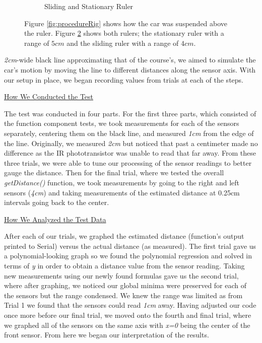 \documentclass[twocolumn]{article}
\newcommand{\rpm}{\raisebox{.2ex}{$\scriptstyle\pm$}}
\newcommand{\subsectionTitle}[1]{ {\hspace{2em}\uline{#1}} \\ \vspace{1em} }
\begin{document}
\begin{flushleft}
\begin{figure}[H]
{\begin{subfigure}[b]{0.45\textwidth}
					\caption{Sliding and Stationary Ruler}
					\label{fig:procedureRuler}
				\end{subfigure}
				
				\caption{Figure \ref{fig:procedureRig} shows how the car was suspended above the ruler. Figure \ref{fig:procedureRuler} shows both rulers; the stationary ruler with a range of \rpm$5cm$ and the sliding ruler with a range of \rpm$4cm$.}
			}
		\end{figure}

		\textit{2cm}-wide black line approximating that of the course’s, we aimed to simulate the car’s motion by moving the line to different distances along the sensor axis. With our setup in place, we began recording values from trials at each of the steps. \\ \vspace{1em}
		
		\subsectionTitle{How We Conducted the Test}

		\hspace{1em}The test was conducted in four parts. For the first three parts, which consisted of the function component tests, we took measurements for each of the sensors separately, centering them on the black line, and measured \rpm\textit{1cm} from the edge of the line. Originally, we measured \rpm\textit{2cm} but noticed that past a centimeter made no difference as the IR phototransistor was unable to read that far away. From these three trials, we were able to tune our processing of the sensor readings to better gauge the distance. Then for the final trial, where we tested the overall \textit{getDistance()} function, we took measurements by going to the right and left sensors (\rpm\textit{4cm}) and taking measurements of the estimated distance at 0.25cm intervals going back to the center. \\ \vspace{1em}
		
		\subsectionTitle{How We Analyzed the Test Data}

		\hspace{1em}After each of our trials, we graphed the estimated distance (function’s output printed to Serial) versus the actual distance (as measured). The first trial gave us a polynomial-looking graph so we found the polynomial regression and solved in terms of \textit{y} in order to obtain a distance value from the sensor reading. Taking new measurements using our newly found formulas gave us the second trial, where after graphing, we noticed our global minima were preserved for each of the sensors but the range condensed. We knew the range was limited as from Trial 1 we found that the sensors could read \rpm\textit{1cm} away. Having adjusted our code once more before our final trial, we moved onto the fourth and final trial, where we graphed all of the sensors on the same axis with \textit{x=0} being the center of the front sensor. From here we began our interpretation of the results. \\ \vspace{3em}
		

\end{flushleft}
\end{document}
